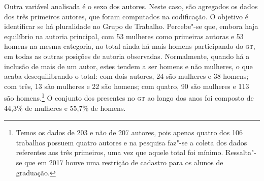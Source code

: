 {

Outra variável analisada é o sexo dos autores. Neste caso, são
agregados os dados dos três primeiros autores, que foram
computados na codificação. O objetivo é identificar se há pluralidade no
Grupo de Trabalho. Percebe"-se que, embora haja equilíbrio na autoria
principal, com 53 mulheres como primeiras autoras e 53 homens na mesma
categoria, no total ainda há mais homens participando do \textsc{gt}, em todas as
outras posições de autoria observadas. Normalmente, quando há a inclusão
de mais de um autor, estes tendem a ser homens e não mulheres, o que
acaba desequilibrando o total: com dois autores, 24 são mulheres e 38 homens; com três, 13 são mulheres e 22 são homens; com quatro, 90 são mulheres e 113 são homens.\footnote{Temos os dados de 203 e não de 207 autores, pois apenas quatro dos 106 trabalhos possuem quatro autores e na pesquisa faz"-se a coleta dos dados referentes aos três primeiros, uma vez que aquele total foi mínimo. Ressalta"-se que em 2017 houve uma restrição de cadastro para os alunos de graduação.} O conjunto dos presentes no \textsc{gt} ao longo
dos anos foi composto de 44,3\% de mulheres e 55,7\% de homens.

}
